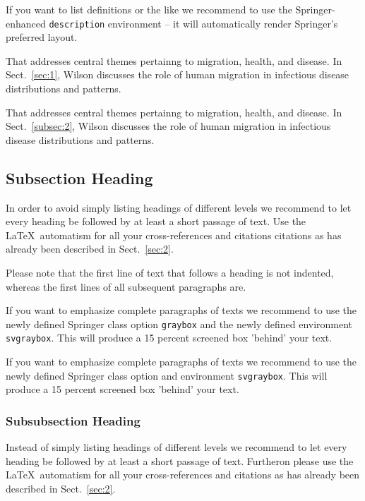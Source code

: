 If you want to list definitions or the like we recommend to use the Springer-enhanced \verb|description| environment -- it will automatically render Springer's preferred layout.

\begin{description}[Type 1]
\item[Type 1]{That addresses central themes pertainng to migration, health, and disease. In Sect.~\ref{sec:1}, Wilson discusses the role of human migration in infectious disease distributions and patterns.}
\item[Type 2]{That addresses central themes pertainng to migration, health, and disease. In Sect.~\ref{subsec:2}, Wilson discusses the role of human migration in infectious disease distributions and patterns.}
\end{description}

\subsection{Subsection Heading} %
In order to avoid simply listing headings of different levels we recommend to let every heading be followed by at least a short passage of text. Use the \LaTeX\ automatism for all your cross-references and citations citations as has already been described in Sect.~\ref{sec:2}.

Please note that the first line of text that follows a heading is not indented, whereas the first lines of all subsequent paragraphs are.

\begin{svgraybox}
If you want to emphasize complete paragraphs of texts we recommend to use the newly defined Springer class option \verb|graybox| and the newly defined environment \verb|svgraybox|. This will produce a 15 percent screened box 'behind' your text.

If you want to emphasize complete paragraphs of texts we recommend to use the newly defined Springer class option and environment \verb|svgraybox|. This will produce a 15 percent screened box 'behind' your text.
\end{svgraybox}


\subsubsection{Subsubsection Heading}
Instead of simply listing headings of different levels we recommend to let every heading be followed by at least a short passage of text. Furtheron please use the \LaTeX\ automatism for all your cross-references and citations as has already been described in Sect.~\ref{sec:2}.

